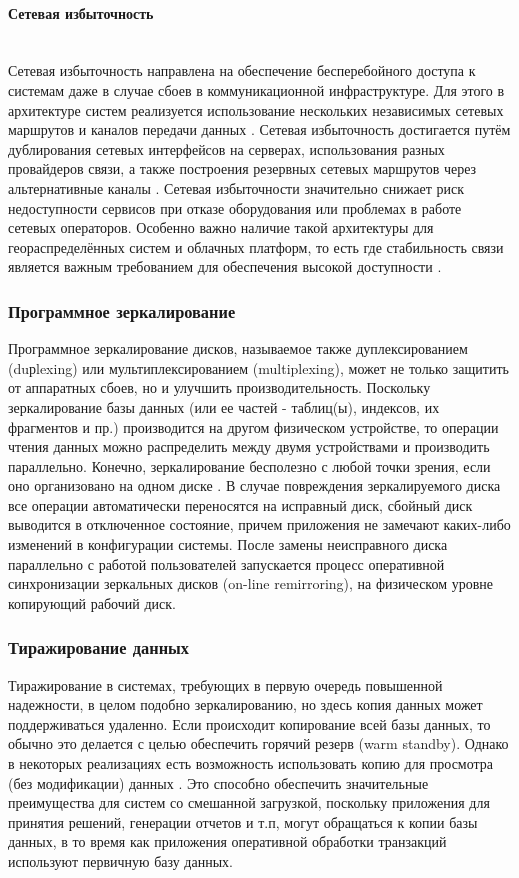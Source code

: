 \paragraph{Сетевая избыточность} ~\\
Сетевая избыточность направлена на обеспечение бесперебойного доступа к системам даже в случае сбоев в коммуникационной инфраструктуре. Для этого в архитектуре систем реализуется использование нескольких независимых сетевых маршрутов и каналов передачи данных \autocites{RajeshKumar}{heycoachHAA}.
Сетевая избыточность достигается путём дублирования сетевых интерфейсов на серверах, использования разных провайдеров связи, а также построения резервных сетевых маршрутов через альтернативные каналы \autocite{OszuValduriez}.
Сетевая избыточности значительно снижает риск недоступности сервисов при отказе оборудования или проблемах в работе сетевых операторов. Особенно важно наличие такой архитектуры для геораспределённых систем и облачных платформ, то есть где стабильность связи является важным требованием для обеспечения высокой доступности \autocite{Kleppmann}.

\subsubsection{Программное зеркалирование} 

Программное зеркалирование дисков, называемое также дуплексированием (duрlexing) или мультиплексированием (multiplexing), может не только защитить от аппаратных сбоев, но и улучшить производительность. Поскольку зеркалирование базы данных (или ее частей - таблиц(ы), индексов, их фрагментов и пр.) производится на другом физическом устройстве, то операции чтения данных можно распределить между двумя устройствами и производить параллельно. Конечно, зеркалирование бесполезно с любой точки зрения, если оно организовано на одном диске \autocite{Baron}.
В случае повреждения зеркалируемого диска все операции автоматически переносятся на исправный диск, сбойный диск выводится в отключенное состояние, причем приложения не замечают каких-либо изменений в конфигурации системы.
После замены неисправного диска параллельно с работой пользователей запускается процесс оперативной синхронизации зеркальных дисков (on-line remirroring), на физическом уровне копирующий рабочий диск. \\

\subsubsection{Тиражирование данных}
Тиражирование в системах, требующих в первую очередь повышенной надежности, в целом подобно зеркалированию, но здесь копия данных может поддерживаться удаленно. Если происходит копирование всей базы данных, то обычно это делается с целью обеспечить горячий резерв (warm standby). Однако в некоторых реализациях есть возможность использовать копию для просмотра (без модификации) данных \autocite{Baron}. Это способно обеспечить значительные преимущества для систем со смешанной загрузкой, поскольку приложения для принятия решений, генерации отчетов и т.п, могут обращаться к копии базы данных, в то время как приложения оперативной обработки транзакций используют первичную базу данных.


